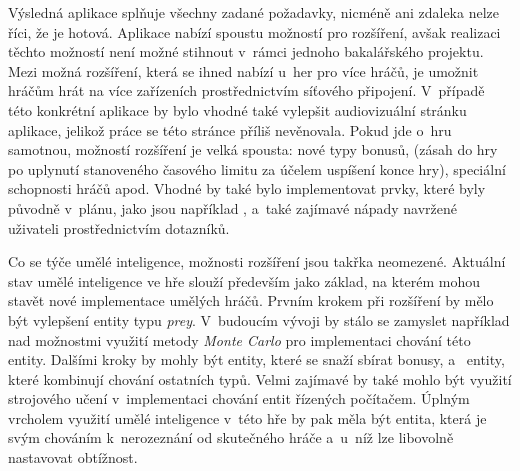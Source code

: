 Výsledná aplikace splňuje všechny zadané požadavky, nicméně ani zdaleka nelze říci, že je hotová. Aplikace nabízí spoustu možností pro rozšíření, avšak realizaci těchto možností není možné stihnout v~rámci jednoho bakalářského projektu. Mezi možná rozšíření, která se ihned nabízí u~her pro více hráčů, je umožnit hráčům hrát na více zařízeních prostřednictvím síťového připojení. V~případě této konkrétní aplikace by bylo vhodné také vylepšit audiovizuální stránku aplikace, jelikož práce se této stránce příliš nevěnovala. Pokud jde o~hru samotnou, možností rozšíření je velká spousta: nové typy bonusů,  (zásah do hry po uplynutí stanoveného časového limitu za účelem uspíšení konce hry), speciální schopnosti hráčů apod. Vhodné by také bylo implementovat prvky, které byly původně v~plánu, jako jsou například , a~také zajímavé nápady navržené uživateli prostřednictvím dotazníků.

Co se týče umělé inteligence, možnosti rozšíření jsou takřka neomezené. Aktuální stav umělé inteligence ve hře slouží především jako základ, na kterém mohou stavět nové implementace umělých hráčů. Prvním krokem při rozšíření by mělo být vylepšení entity typu \emph{prey}. V~budoucím vývoji by stálo se zamyslet například nad možnostmi využití metody \emph{Monte Carlo} pro implementaci chování této entity. Dalšími kroky by mohly být entity, které se snaží sbírat bonusy, a~ entity, které kombinují chování ostatních typů. Velmi zajímavé by také mohlo být využití strojového učení v~implementaci chování entit řízených počítačem. Úplným vrcholem využití umělé inteligence v~této hře by pak měla být entita, která je svým chováním k~nerozeznání od skutečného hráče a~u~níž lze libovolně nastavovat obtížnost.

